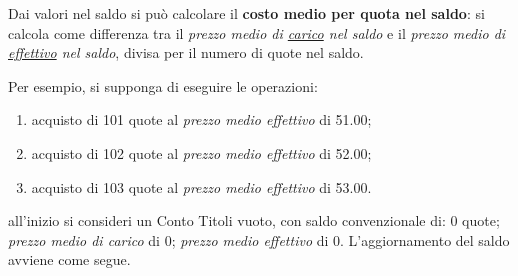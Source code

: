 \documentclass[12pt,a4paper]{article}
\newcommand{\Eur}[1]{\SI{#1}{\text{\euro{}}}}
\begin{document}
Dai valori nel saldo si può calcolare il \textbf{costo medio per quota nel saldo}: si
calcola come differenza tra il \emph{prezzo  medio di \underline{carico} nel saldo} e
il \emph{prezzo  medio di \underline{effettivo} nel  saldo}, divisa per il  numero di
quote nel saldo.

Per esempio, si supponga di eseguire le operazioni:
\begin{enumerate}
\item acquisto di \num{101} quote al \emph{prezzo medio effettivo} di \Eur{51,00};
\item acquisto di \num{102} quote al \emph{prezzo medio effettivo} di \Eur{52,00};
\item acquisto di \num{103} quote al \emph{prezzo medio effettivo} di \Eur{53,00}.
\end{enumerate}
all'inizio si  consideri un Conto Titoli  vuoto, con saldo convenzionale  di: \num{0}
quote; \emph{prezzo  medio di  carico} di \Eur{0};  \emph{prezzo medio  effettivo} di
\Eur{0}.  L'aggiornamento del saldo avviene come segue.
\end{document}
